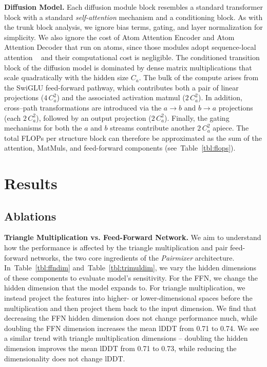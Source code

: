 \documentclass{article} %
\renewcommand{\paragraph}[1]{\vspace{1.25mm}\noindent\textbf{#1}}
\newcommand{\reftbl}[1]{Table~\ref{tbl:#1}}
\newcommand{\lblsec}[1]{\label{sec:#1}}
\def\name{{\textit{Pairmixer}}\xspace}
\begin{document}
\paragraph{Diffusion Model.}
Each diffusion module block resembles a standard transformer block with a standard \textit{self-attention} mechanism and a conditioning block. As with the trunk block analysis, we ignore bias terms, gating, and layer normalization for simplicity. We also ignore the cost of Atom Attention Encoder and Atom Attention Decoder that run on atoms, since those modules adopt sequence-local attention ~\citep{wohlwend2024boltz1} and their computational cost is negligible.
The conditioned transition block of the diffusion model is dominated by dense matrix multiplications that scale quadratically with the hidden size $C_a$. The bulk of the compute arises from the SwiGLU feed-forward pathway, which contributes both a pair of linear projections
($4\,C_a^{2}$) and the associated activation matmul ($2\,C_a^{2}$). In addition, cross--path transformations are introduced via the $a \!\to\! b$ and $b \!\to\! a$ projections (each $2\,C_a^{2}$), followed by an output projection ($2\,C_a^{2}$). Finally, the gating mechanisms for both the $a$ and $b$ streams contribute
another $2\,C_a^{2}$ apiece. The total FLOPs per structure block can therefore be approximated as the sum of the attention, MatMuls, and feed-forward components (see~\reftbl{flops}).



\section{Results}

\subsection{Ablations}
\lblsec{ablations}
\paragraph{Triangle Multiplication vs. Feed-Forward Network. }
We aim to understand how the performance is affected by the triangle multiplication and pair feed-forward networks, the two core ingredients of the \name architecture.
In~\reftbl{ffndim} and~\reftbl{trimuldim}, we vary the hidden dimensions of these components to evaluate model's sensitivity.
For the FFN, we change the hidden dimension that the model expands to.
For triangle multiplication, we instead project the features into higher- or lower-dimensional spaces before the multiplication and then project them back to the input dimension.
We find that decreasing the FFN hidden dimension does not change performance much, while doubling the FFN dimension increases the mean lDDT from 0.71 to 0.74.
We see a similar trend with triangle multiplication dimensions -- doubling the hidden dimension improves the mean lDDT from 0.71 to 0.73, while reducing the dimensionality does not change lDDT.
\end{document}
